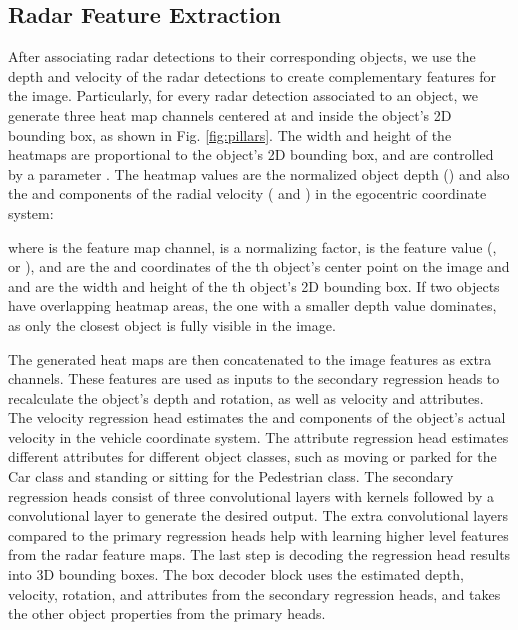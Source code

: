\documentclass[10pt,twocolumn,letterpaper]{article}
\begin{document}
   
   \subsection{Radar Feature Extraction}
   After associating radar detections to their corresponding objects, we use the 
   depth and velocity of the radar detections to create complementary features for
   the image. Particularly, for every radar detection associated to an object, 
   we generate three heat map channels centered at and inside the object's 2D bounding 
   box, as shown in Fig. \ref{fig:pillars}. 
   The width and height of the heatmaps are proportional to the object's 2D bounding
   box, and are controlled by a parameter .
   The heatmap values are the normalized object depth () and also the  and  
   components of the radial velocity ( and ) in the egocentric coordinate system:
   
   

   where  is the feature map channel,  is a normalizing factor,
    is the feature value (,  or ),  and  are 
   the  and  coordinates of the th object's center point on the image and 
    and  are the width and height of the th object's 2D bounding box.
   If two objects have overlapping heatmap areas, the one with a smaller depth value
   dominates, as only the closest object is fully visible in the image.
   
   The generated heat maps are then concatenated to the image features as extra channels. 
   These features are used as inputs to the secondary regression heads to recalculate 
   the object's depth and rotation, as well as velocity 
   and attributes. The velocity regression head estimates
   the  and  components of the object's actual velocity in the vehicle coordinate
   system. The attribute regression head estimates different attributes for different 
   object classes, such as moving or parked for the Car class and standing or sitting
   for the Pedestrian class. The secondary regression heads consist of three convolutional 
   layers with  kernels followed by a  convolutional layer to generate
   the desired output. The extra convolutional layers compared to the primary regression 
   heads help with learning higher level features from the radar feature maps. The last 
   step is decoding the regression head results into 3D bounding boxes. The box decoder
   block uses the estimated depth, velocity, rotation, and attributes from the secondary
   regression heads, and takes the other object properties from the primary heads. 
   
\end{document}
